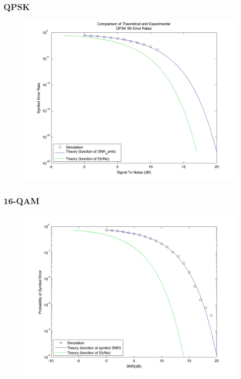\documentclass[]{article}
\begin{document}
\subsubsection{QPSK}
\begin{figure}[H]
\centering
\includegraphics[width=\textwidth]{qpSNR.jpg}
\caption{}
\end{figure}
\subsubsection{16-QAM}
\begin{figure}[H]
\centering
\includegraphics[width=\textwidth]{qam16SNR.jpg}
\caption{}
\end{figure}
\end{document}
